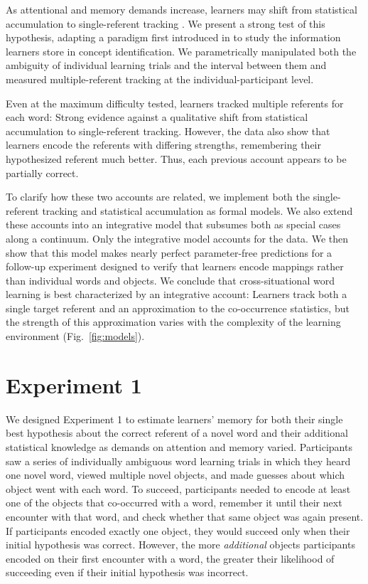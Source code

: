 \documentclass{pnastwo}
\begin{document}
\begin{article}
\noindent As attentional and memory demands increase, learners may shift from statistical accumulation to single-referent tracking \citep{Smith2011a, Trueswell2013}. We present a strong test of this hypothesis, adapting a paradigm first introduced in \citep{Bower1963} to study the information learners store in concept identification. We parametrically manipulated both the ambiguity of individual learning trials and the interval between them and measured multiple-referent tracking at the individual-participant level.

Even at the maximum difficulty tested, learners tracked multiple referents for each word: Strong evidence against a qualitative shift from statistical accumulation to single-referent tracking. However, the data also show that learners encode the referents with differing strengths, remembering their hypothesized referent much better. Thus, each previous account appears to be partially correct. 

To clarify how these two accounts are related, we implement both the single-referent tracking and statistical accumulation as formal models. We also extend these accounts into an integrative model that subsumes both as special cases along a continuum. Only the integrative model accounts for the data. We then show that this model makes nearly perfect parameter-free predictions for a follow-up experiment designed to verify that learners encode mappings rather than individual words and objects. We conclude that cross-situational word learning is best characterized by an integrative account: Learners track both a single target referent and an approximation to the co-occurrence statistics, but the strength of this approximation varies with the complexity of the learning environment (Fig.~\ref{fig:models}).

\section{Experiment 1}

We designed Experiment 1 to estimate learners' memory for both their single best hypothesis about the correct referent of a novel word and their additional statistical knowledge as demands on attention and memory varied. Participants saw a series of individually ambiguous word learning trials in which they heard one novel word, viewed multiple novel objects, and made guesses about which object went with each word. To succeed, participants needed to encode at least one of the objects that co-occurred with a word, remember it until their next encounter with that word, and check whether that same object was again present. If participants encoded exactly one object, they would succeed only when their initial hypothesis was correct. However, the more \emph{additional} objects participants encoded on their first encounter with a word, the greater their likelihood of succeeding even if their initial hypothesis was incorrect. 


\end{article}
\end{document}
